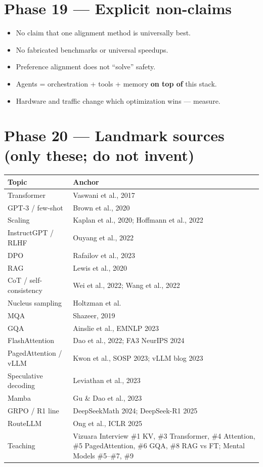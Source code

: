 \documentclass[11pt,a4paper]{article}
\begin{document}
{{\bigskip


\clearpage
\section{Phase 19 --- Explicit non-claims}


\begin{itemize}
\item No claim that one alignment method is universally best.  
\item No fabricated benchmarks or universal speedups.  
\item Preference alignment does not ``solve'' safety.  
\item Agents = orchestration + tools + memory \textbf{on top of} this stack.  
\item Hardware and traffic change which optimization wins --- measure.
\end{itemize}


\bigskip


\clearpage
\section{Phase 20 --- Landmark sources (only these; do not invent)}


\begin{table}[ht]
\centering\small
\begin{tabularx}{\textwidth}{@{}YY@{}}
\toprule
\textbf{Topic} & \textbf{Anchor} \\
\midrule
Transformer & Vaswani et al., 2017 \\
GPT-3 / few-shot & Brown et al., 2020 \\
Scaling & Kaplan et al., 2020; Hoffmann et al., 2022 \\
InstructGPT / RLHF & Ouyang et al., 2022 \\
DPO & Rafailov et al., 2023 \\
RAG & Lewis et al., 2020 \\
CoT / self-consistency & Wei et al., 2022; Wang et al., 2022 \\
Nucleus sampling & Holtzman et al. \\
MQA & Shazeer, 2019 \\
GQA & Ainslie et al., EMNLP 2023 \\
FlashAttention & Dao et al., 2022; FA3 NeurIPS 2024 \\
PagedAttention / vLLM & Kwon et al., SOSP 2023; vLLM blog 2023 \\
Speculative decoding & Leviathan et al., 2023 \\
Mamba & Gu \& Dao et al., 2023 \\
GRPO / R1 line & DeepSeekMath 2024; DeepSeek-R1 2025 \\
RouteLLM & Ong et al., ICLR 2025 \\
Teaching & Vizuara Interview \#1 KV, \#3 Transformer, \#4 Attention, \#5 PagedAttention, \#6 GQA, \#8 RAG vs FT; Mental Models \#5--\#7, \#9 \\
\bottomrule
\end{tabularx}
\end{table}


}}
\end{document}
